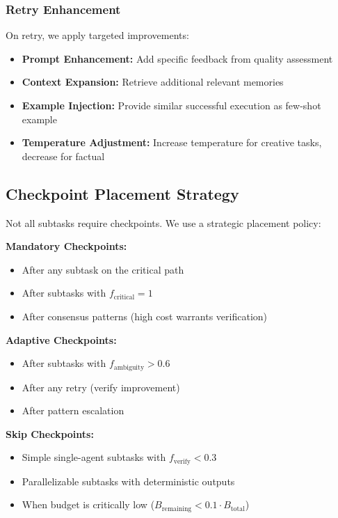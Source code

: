 \documentclass{article}
\theoremstyle{plain}
\theoremstyle{definition}
\theoremstyle{remark}
\begin{document}
\subsubsection{Retry Enhancement}

On retry, we apply targeted improvements:
\begin{itemize}
	\item \textbf{Prompt Enhancement:} Add specific feedback from quality assessment
	\item \textbf{Context Expansion:} Retrieve additional relevant memories
	\item \textbf{Example Injection:} Provide similar successful execution as few-shot example
	\item \textbf{Temperature Adjustment:} Increase temperature for creative tasks, decrease for factual
\end{itemize}

\subsection{Checkpoint Placement Strategy}
\label{sec:rcm_placement}

Not all subtasks require checkpoints. We use a strategic placement policy:

\textbf{Mandatory Checkpoints:}
\begin{itemize}
	\item After any subtask on the critical path
	\item After subtasks with $f_{\text{critical}} = 1$
	\item After consensus patterns (high cost warrants verification)
\end{itemize}

\textbf{Adaptive Checkpoints:}
\begin{itemize}
	\item After subtasks with $f_{\text{ambiguity}} > 0.6$
	\item After any retry (verify improvement)
	\item After pattern escalation
\end{itemize}

\textbf{Skip Checkpoints:}
\begin{itemize}
	\item Simple single-agent subtasks with $f_{\text{verify}} < 0.3$
	\item Parallelizable subtasks with deterministic outputs
	\item When budget is critically low ($B_{\text{remaining}} < 0.1 \cdot B_{\text{total}}$)
\end{itemize}
\end{document}
